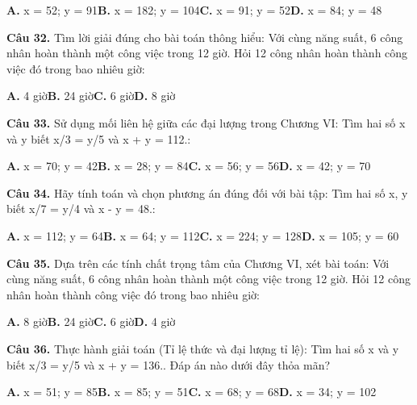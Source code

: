 \documentclass[11pt,a4paper]{article}
\begin{document}
\hspace*{1.5em}\textbf{A.} x = 52; y = 91\quad\quad \textbf{B.} x = 182; y = 104\quad\quad \textbf{C.} x = 91; y = 52\quad\quad \textbf{D.} x = 84; y = 48\par\vspace{2pt}
\textbf{\color{primary} Câu 32.} Tìm lời giải đúng cho bài toán thông hiểu: Với cùng năng suất, 6 công nhân hoàn thành một công việc trong 12 giờ. Hỏi 12 công nhân hoàn thành công việc đó trong bao nhiêu giờ:\par
\hspace*{1.5em}\textbf{A.} 4 giờ\quad\quad \textbf{B.} 24 giờ\quad\quad \textbf{C.} 6 giờ\quad\quad \textbf{D.} 8 giờ\par\vspace{2pt}
\textbf{\color{primary} Câu 33.} Sử dụng mối liên hệ giữa các đại lượng trong Chương VI: Tìm hai số x và y biết x/3 = y/5 và x + y = 112.:\par
\hspace*{1.5em}\textbf{A.} x = 70; y = 42\quad\quad \textbf{B.} x = 28; y = 84\quad\quad \textbf{C.} x = 56; y = 56\quad\quad \textbf{D.} x = 42; y = 70\par\vspace{2pt}
\textbf{\color{primary} Câu 34.} Hãy tính toán và chọn phương án đúng đối với bài tập: Tìm hai số x, y biết x/7 = y/4 và x - y = 48.:\par
\hspace*{1.5em}\textbf{A.} x = 112; y = 64\quad\quad \textbf{B.} x = 64; y = 112\quad\quad \textbf{C.} x = 224; y = 128\quad\quad \textbf{D.} x = 105; y = 60\par\vspace{2pt}
\textbf{\color{primary} Câu 35.} Dựa trên các tính chất trọng tâm của Chương VI, xét bài toán: Với cùng năng suất, 6 công nhân hoàn thành một công việc trong 12 giờ. Hỏi 12 công nhân hoàn thành công việc đó trong bao nhiêu giờ:\par
\hspace*{1.5em}\textbf{A.} 8 giờ\quad\quad \textbf{B.} 24 giờ\quad\quad \textbf{C.} 6 giờ\quad\quad \textbf{D.} 4 giờ\par\vspace{2pt}
\textbf{\color{primary} Câu 36.} Thực hành giải toán (Tỉ lệ thức và đại lượng tỉ lệ): Tìm hai số x và y biết x/3 = y/5 và x + y = 136.. Đáp án nào dưới đây thỏa mãn?\par
\hspace*{1.5em}\textbf{A.} x = 51; y = 85\quad\quad \textbf{B.} x = 85; y = 51\quad\quad \textbf{C.} x = 68; y = 68\quad\quad \textbf{D.} x = 34; y = 102\par\vspace{2pt}
\end{document}
